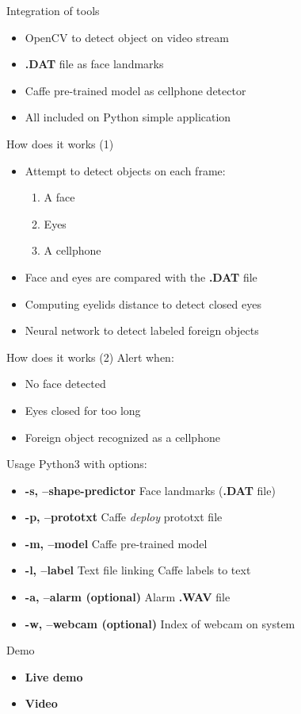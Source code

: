 \documentclass{beamer}
\begin{document}
\begin{frame}{Integration of tools}
    \begin{itemize}
        \item OpenCV to detect object on video stream
        \item \textbf{.DAT} file as face landmarks
        \item Caffe pre-trained model as cellphone detector
        \item All included on Python simple application
    \end{itemize}
\end{frame}

\begin{frame}{How does it works (1)}
    \begin{itemize}
        \item Attempt to detect objects on each frame:
            \begin{enumerate}
                \item A face
                \item Eyes
                \item A cellphone
            \end{enumerate}
        \item Face and eyes are compared with the \textbf{.DAT} file
        \item Computing eyelids distance to detect closed eyes
        \item Neural network to detect labeled foreign objects
    \end{itemize}
\end{frame}

\begin{frame}{How does it works (2)}
         Alert when:
            \begin{itemize}
                \item No face detected
                \item Eyes closed for too long
                \item Foreign object recognized as a cellphone
            \end{itemize}
\end{frame}

\begin{frame}{Usage}
    Python3 with options:
    \begin{itemize}
        \item \textbf{-s, --shape-predictor} Face landmarks (\textbf{.DAT} file)
        \item \textbf{-p, --prototxt} Caffe \textit{deploy} prototxt file
        \item \textbf{-m, --model} Caffe pre-trained model
        \item \textbf{-l, --label} Text file linking Caffe labels to text
        \item \textbf{-a, --alarm (optional)} Alarm \textbf{.WAV} file
        \item \textbf{-w, --webcam (optional)} Index of webcam on system
    \end{itemize}
\end{frame}

\begin{frame}{Demo}
    \begin{itemize}
        \item \textbf{Live demo}
        \item \textbf{Video}
\end{itemize}
\end{frame}
\end{document}
